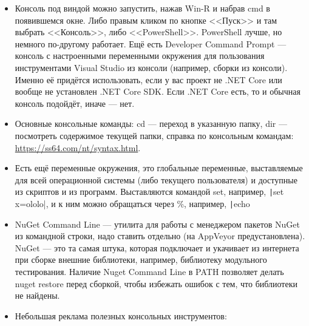 \documentclass[a5paper]{article}
\begin{document}
\begin{itemize}
    \item Консоль под виндой можно запустить, нажав Win-R и набрав cmd в появившемся окне. Либо правым кликом по кнопке <<Пуск>> и там выбрать <<Консоль>>, либо <<PowerShell>>. PowerShell лучше, но немного по-другому работает. Ещё есть Developer Command Prompt --- консоль с настроенными переменными окружения для пользования инструментами Visual Studio из консоли (например, сборки из консоли). Именно её  придётся использовать, если у вас проект не .NET Core или вообще не установлен .NET Core SDK. Если .NET Core есть, то и обычная консоль подойдёт, иначе --- нет.
    \item Основные консольные команды: cd --- переход в указанную папку, dir --- посмотреть содержимое текущей папки, справка по консольным командам: \url{https://ss64.com/nt/syntax.html}.
    \item Есть ещё переменные окружения, это глобальные переменные, выставляемые для всей операционной системы (либо текущего пользователя) и доступные из скриптов и из программ. Выставляются командой set, например, \texttt|set x=ololo|, и к ним можно обращаться через \%, например, \texttt|echo %
    \item NuGet Command Line --- утилита для работы с менеджером пакетов NuGet из командной строки, надо ставить отдельно (на AppVeyor предустановлена). NuGet --- это та самая штука, которая подключает и укачивает из интернета при сборке внешние библиотеки, например, библиотеку модульного тестирования. Наличие Nuget Command Line в PATH позволяет делать nuget restore перед сборкой, чтобы избежать ошибок с тем, что библиотеки не найдены.
    \item Небольшая реклама полезных консольных инструментов:

\end{itemize}
\end{document}
